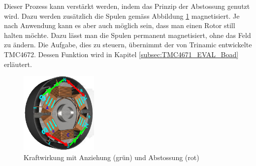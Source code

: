 Dieser Prozess kann verstärkt werden, indem das Prinzip der Abstossung genutzt wird. Dazu werden zusätzlich die Spulen gemäss Abbildung \ref{fig:Kraftwirkung_BLDC_2} magnetisiert. Je nach Anwendung kann es aber auch möglich sein, dass man einen Rotor still halten möchte. Dazu lässt man die Spulen permanent magnetisiert, ohne das Feld zu ändern. Die Aufgabe, dies zu steuern, übernimmt der von Trinamic entwickelte TMC4672. Dessen Funktion wird in Kapitel \ref{subsec:TMC4671_EVAL_Boad} erläutert. 

\begin{figure}[h!]
	\centering
	\includegraphics[height=4cm]{graphics/BLDC_Kraftwirkung_2.jpg}
	\caption{Kraftwirkung mit Anziehung (grün) und Abstossung (rot) \cite{imajey_consulting_engineers_pvt_ltd_brushless_nodate}}
	\label{fig:Kraftwirkung_BLDC_2}
\end{figure}

%



